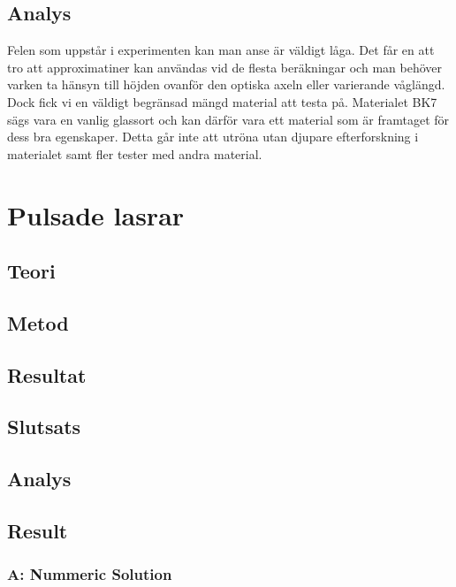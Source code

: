 \documentclass[12pt]{article}
\begin{document}
\subsection{Analys}
Felen som uppstår i experimenten kan man anse är väldigt låga. Det får en att tro att approximatiner kan användas vid de flesta beräkningar och man behöver varken ta hänsyn till höjden ovanför den optiska axeln eller varierande våglängd. Dock fick vi en väldigt begränsad mängd material att testa på. Materialet BK7 sägs vara en vanlig glassort och kan därför vara ett material som är framtaget för dess bra egenskaper. Detta går inte att utröna utan djupare efterforskning i materialet samt fler tester med andra material.


\section{Pulsade lasrar}

\subsection{Teori}

\subsection{Metod}

\subsection{Resultat}

\subsection{Slutsats}

\subsection{Analys}


\subsection{Result}
\subsubsection{A: Nummeric Solution}
\end{document}
